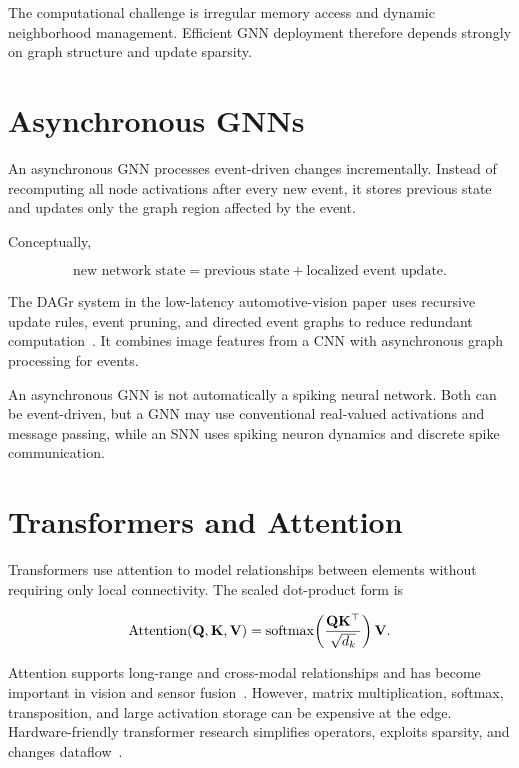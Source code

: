 The computational challenge is irregular memory access and dynamic neighborhood management. Efficient GNN deployment therefore depends strongly on graph structure and update sparsity.

\section{Asynchronous GNNs}

An asynchronous GNN processes event-driven changes incrementally. Instead of recomputing all node activations after every new event, it stores previous state and updates only the graph region affected by the event.

Conceptually,

\[
    \text{new network state}
    = \text{previous state}
    + \text{localized event update}.
\]

The DAGr system in the low-latency automotive-vision paper uses recursive update rules, event pruning, and directed event graphs to reduce redundant computation~\cite{gehrig2024lowlatency}. It combines image features from a CNN with asynchronous graph processing for events.

\begin{keyinsight}
An asynchronous GNN is not automatically a spiking neural network. Both can be event-driven, but a GNN may use conventional real-valued activations and message passing, while an SNN uses spiking neuron dynamics and discrete spike communication.
\end{keyinsight}

\section{Transformers and Attention}

Transformers use attention to model relationships between elements without requiring only local connectivity. The scaled dot-product form is

\[
    \operatorname{Attention}(\mathbf{Q},\mathbf{K},\mathbf{V})
    = \operatorname{softmax}\!\left(
        \frac{\mathbf{Q}\mathbf{K}^{\top}}{\sqrt{d_k}}
      \right)\mathbf{V}.
\]

Attention supports long-range and cross-modal relationships and has become important in vision and sensor fusion~\cite{vaswani2017attention}. However, matrix multiplication, softmax, transposition, and large activation storage can be expensive at the edge. Hardware-friendly transformer research simplifies operators, exploits sparsity, and changes dataflow~\cite{zhou2025neuromorphictransformer}.

